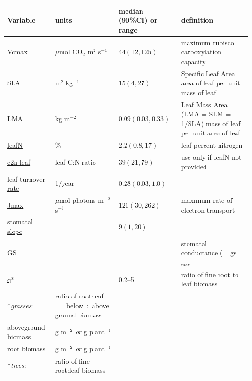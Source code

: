 \documentclass[12pt,english,portrait]{article}
\begin{document}
\begin{table}
  \begin{tabular}{p{1.7in}p{1.7in}p{1.25in}p{2in}}
    \hline    
    Variable  & units & median (90\%CI) or range & definition \\
    \hline
    \href{http://ebi-forecast.igb.uiuc.edu/bety/variables/4}{Vcmax} &$\mu$mol CO$_2$ m$^{2}$ s$^{-1}$ &$44 (12, 125)$ & maximum rubisco carboxylation capacity\\
    \href{http://ebi-forecast.igb.uiuc.edu/bety/variables/15}{SLA}  & m$^2$ kg$^{-1}$ &$15(4,27)$ 
    & Specific Leaf Area area of leaf per unit mass of leaf \\
    \href{http://ebi-forecast.igb.uiuc.edu/bety/variables/254}{LMA} &   kg m$^{-2}$ & $0.09 (0.03, 0.33)$ 
    & Leaf Mass Area (LMA = SLM = 1/SLA) mass of leaf per unit area of leaf  \\
    \href{http://ebi-forecast.igb.uiuc.edu/bety/variables/10}{leafN}  & \% & $2.2(0.8, 17)$  
    & leaf percent nitrogen\\ 
    \href{http://ebi-forecast.igb.uiuc.edu/bety/variables/31}{c2n leaf}  &  leaf C:N ratio &$39(21,79)$ &  use only if leafN not provided \\
    \href{http://ebi-forecast.igb.uiuc.edu/bety/variables/40}{leaf turnover rate} & 1/year&$0.28(0.03,1.0) $ & \\
    \href{http://ebi-forecast.igb.uiuc.edu/bety/variables/5}{Jmax} & 	$\mu$mol photons m$^{-2}$ s$^{-1}$& $121(30, 262)$& maximum rate of electron transport \\ 
    \href{http://ebi-forecast.igb.uiuc.edu/bety/variables/26}{stomatal slope}  &  &$9(1, 20)$ & \\
    \href{http://ebi-forecast.igb.uiuc.edu/bety/variables/9}{GS} &  & & stomatal conductance (= gs$_{\textrm{max}}$ \\ 
    \href{http://ebi-forecast.igb.uiuc.edu/bety/variables/21}{q}{*} & &0.2--5 & ratio of fine root to leaf biomass\\
    \hspace{0.5em}*\emph{grasses}:  &  ratio of root:leaf $ =$ below~:~above ground biomass \\
    \hspace{1em} aboveground biomass  &  g m$^{-2}$ \emph{or} g plant$^{-1}$ & &\\
    \hspace{1em} root biomass  & g m$^{-2}$ \emph{or} g plant$^{-1}$ & & \\
    \hspace{0.5em}*\emph{trees}:  &  ratio of fine root:leaf biomass  \\

\end{tabular}
\end{table}
\end{document}
